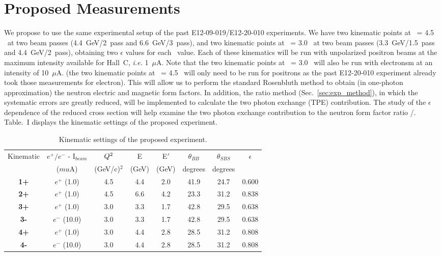 \section{Proposed Measurements} 
\label{prop}

We propose to use the same experimental setup of the past E12-09-019/E12-20-010 experiments.
We have two kinematic points at \qsq~= 4.5 \gevcsq~at two beam passes (4.4~GeV/2~pass and 6.6~GeV/3~pass), and two kinematic points at \qsq~= 3.0 \gevcsq~at two beam passes (3.3~GeV/1.5~pass and 4.4~GeV/2~pass), obtaining two $\epsilon$ values for each \qsq~value.
Each of these kinematics will be run with unpolarized positron beams at the maximum intensity available for Hall~C, {\it i.e.} 1~$\mu$A. 
Note that the two kinematic points at \qsq~= 3.0 \gevcsq~will also be run with electronsm at an intensity of 10~$\mu$A.
(the two kinematic points at \qsq~= 4.5 \gevcsq~will only need to be run for positrons as the past E12-20-010 experiment already took those measurements for electron).
This will allow us to perform the standard Rosenbluth method to obtain (in one-photon approximation) the neutron electric and magnetic form factors.
In addition, the ratio method (Sec.~\ref{sec:exp_method}), in which the systematic errors are greatly reduced, will be implemented to calculate the two photon exchange (TPE) contribution. The study of the $\epsilon$ dependence of the reduced cross section will help examine the two photon exchange contribution to the neutron form factor ratio \gen/\gmn.
Table.~I %
displays the kinematic settings of the proposed experiment.

\begin{table}[!h] 
\centering
\begin{tabular}{|c|c|c|c|c|c|c|c|}
\hline
Kinematic & $e^{+}/e^{-}$ - I$_{beam}$ & $Q\textsuperscript{2}$  & E & E$'$  & $\theta_{BB}$ & $\theta_{SBS}$ & $\epsilon$ \\
& ($mu$A) & (GeV/c)$^2$ & (GeV) & (GeV)  & degrees &  degrees   &   \\
\hline
{\bf1+} & $e^{+}$ (1.0) & 4.5 & 4.4 & 2.0 & 41.9 & 24.7 & 0.600 \\
\hline
{\bf2+} & $e^{+}$ (1.0) & 4.5 & 6.6 & 4.2 & 23.3 & 31.2 & 0.838 \\
\hline
{\bf3+} & $e^{+}$ (1.0) & 3.0 & 3.3 & 1.7 & 42.8 & 29.5 & 0.638 \\
\hline
{\bf3-} & $e^{-}$ (10.0) & 3.0 & 3.3 & 1.7 & 42.8 & 29.5 & 0.638 \\
\hline
{\bf4+} & $e^{+}$ (1.0) & 3.0 & 4.4 & 2.8 & 28.5 & 31.2 & 0.808 \\
\hline
{\bf4-} & $e^{-}$ (10.0) & 3.0 & 4.4 & 2.8 & 28.5 & 31.2 & 0.808 \\
\hline
\end{tabular} 
\caption{Kinematic settings of the proposed experiment.}
\label{tab:propkin}
\end{table}

